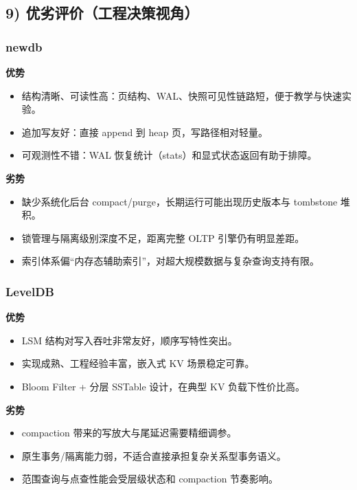 \subsection{9) 优劣评价（工程决策视角）}

\subsubsection{newdb}
\textbf{优势}
\begin{itemize}
  \item 结构清晰、可读性高：页结构、WAL、快照可见性链路短，便于教学与快速实验。
  \item 追加写友好：直接 append 到 heap 页，写路径相对轻量。
  \item 可观测性不错：WAL 恢复统计（stats）和显式状态返回有助于排障。
\end{itemize}
\textbf{劣势}
\begin{itemize}
  \item 缺少系统化后台 compact/purge，长期运行可能出现历史版本与 tombstone 堆积。
  \item 锁管理与隔离级别深度不足，距离完整 OLTP 引擎仍有明显差距。
  \item 索引体系偏“内存态辅助索引”，对超大规模数据与复杂查询支持有限。
\end{itemize}

\subsubsection{LevelDB}
\textbf{优势}
\begin{itemize}
  \item LSM 结构对写入吞吐非常友好，顺序写特性突出。
  \item 实现成熟、工程经验丰富，嵌入式 KV 场景稳定可靠。
  \item Bloom Filter + 分层 SSTable 设计，在典型 KV 负载下性价比高。
\end{itemize}
\textbf{劣势}
\begin{itemize}
  \item compaction 带来的写放大与尾延迟需要精细调参。
  \item 原生事务/隔离能力弱，不适合直接承担复杂关系型事务语义。
  \item 范围查询与点查性能会受层级状态和 compaction 节奏影响。
\end{itemize}

